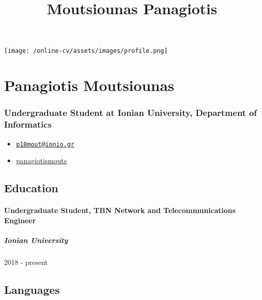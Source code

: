 \documentclass[english,]{article}
\title{Moutsiounas Panagiotis}
\date{}
\providecommand{\tightlist}{%
  \setlength{\itemsep}{0pt}\setlength{\parskip}{0pt}}
\let\oldparagraph\paragraph
\renewcommand{\paragraph}[1]{\oldparagraph{#1}\mbox{}}
\let\oldsubparagraph\subparagraph
\renewcommand{\subparagraph}[1]{\oldsubparagraph{#1}\mbox{}}
\begin{document}
\maketitle

\texttt{[image: /online-cv/assets/images/profile.png]}

\hypertarget{panagiotis-moutsiounas}{%
\section{Panagiotis Moutsiounas}\label{panagiotis-moutsiounas}}

\hypertarget{undergraduate-student-at-ionian-university-department-of-informatics}{%
\subsubsection{Undergraduate Student at Ionian University, Department of
Informatics}\label{undergraduate-student-at-ionian-university-department-of-informatics}}

\begin{itemize}
\tightlist
\item
  \emph{} \href{mailto:p18mout@ionio.gr}{\nolinkurl{p18mout@ionio.gr}}
\item
  \emph{} \href{http://github.com/panagiotismouts}{panagiotismouts}
\end{itemize}

\hypertarget{education}{%
\subsection{Education}\label{education}}

\hypertarget{undergraduate-student-tbn-network-and-telecommunications-engineer}{%
\paragraph{Undergraduate Student, TBN Network and Telecommunications
Engineer}\label{undergraduate-student-tbn-network-and-telecommunications-engineer}}

\hypertarget{ionian-university}{%
\subparagraph{Ionian University}\label{ionian-university}}

2018 - present

\hypertarget{languages}{%
\subsection{Languages}\label{languages}}
\end{document}
